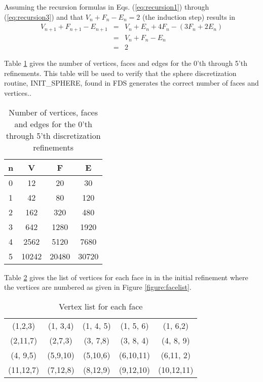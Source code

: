 \documentclass[12pt]{article}
\begin{document}
Assuming the recursion formulas in Eqs. (\ref{eq:recursion1}) through (\ref{eq:recursion3}) and that $V_n+F_n-E_n=2$ (the induction step) results in
\begin{eqnarray*}
V_{n+1}+F_{n+1}-E_{n+1}&=&V_n+E_n+4 F_n-(3 F_n+2 E_n)\\
&=&V_n+F_n-E_n\\
&=&2
\end{eqnarray*}

Table \ref{table:refinement} gives the number of vertices, faces and edges for the 0'th through 5'th refinements.
This table will be used to verify that the sphere discretization routine, {\ct INIT\_SPHERE}, found in FDS generates the correct number of faces and vertices..
\vskip 0.1in
\par
\begin{table}
\caption{Number of vertices, faces and edges for the 0'th through 5'th discretization refinements}
\begin{tabular}{|c|c|c|c|}
  \hline
n& V&F&E\\
\hline
0&	12&	20&	30\\
1&	42&	80&	120\\
2&	162&	320&	480\\
3&	642&	1280&	1920\\
4&	2562&	5120&	7680\\
5&	10242&	20480&	30720\\
  \hline
\end{tabular}
\label{table:refinement}
\end{table}

Table \ref{table:facelist} gives the list of vertices for each face in
in the initial refinement where the vertices are numbered as given  in
Figure \ref{figure:facelist}.
\begin{table}
\caption{Vertex list for each face}
\begin{center}
\begin{tabular}{ccccc}
  \hline
  (1,2,3)&   (1, 3,4)&  (1, 4, 5)&   (1, 5, 6)&   (1, 6,2)\\
  (2,11,7)&  (2,7,3)&   (3, 7,8)&  (3, 8, 4)&   (4, 8, 9)\\
  (4, 9,5)&  (5,9,10)&   (5,10,6)& (6,10,11)&   (6,11, 2)   \\
  (11,12,7)& (7,12,8)&   (8,12,9)&   (9,12,10)&   (10,12,11)   \\
  \hline
\end{tabular}
\end{center}
\label{table:facelist}
\end{table}
\end{document}
